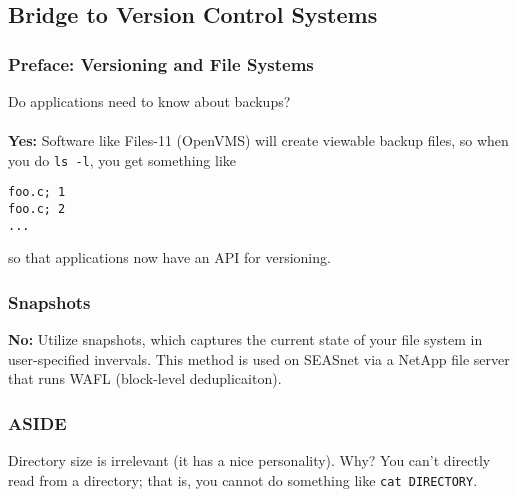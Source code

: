 \documentclass[13pt]{article}
\begin{document}
\subsection{Bridge to Version Control Systems}
\subsubsection{Preface: Versioning and File Systems}
Do applications need to know about backups? \\ \\
\textbf{Yes:} Software like Files-11 (OpenVMS) will create viewable backup files, so when you do \texttt{ls -l}, you get something like
\begin{verbatim}
foo.c; 1
foo.c; 2
...
\end{verbatim}
so that applications now have an API for versioning.

\subsubsection{Snapshots}
\textbf{No:} Utilize snapshots, which captures the current state of your file system in user-specified invervals. This method is used on SEASnet via a NetApp file server that runs WAFL (block-level deduplicaiton).
\subsubsection*{ASIDE}
Directory size is irrelevant (it has a nice personality). Why? You can't directly read from a directory; that is, you cannot do something like \texttt{cat DIRECTORY}.
\end{document}
